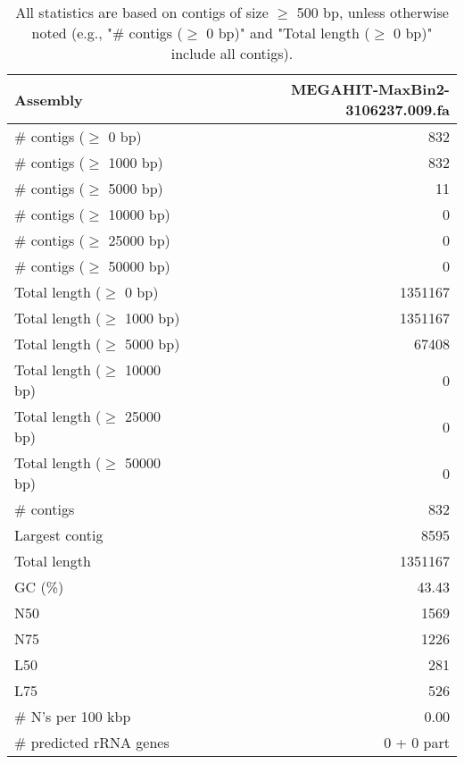 \documentclass[12pt,a4paper]{article}
\begin{document}
\begin{table}[ht]
\begin{center}
\caption{All statistics are based on contigs of size $\geq$ 500 bp, unless otherwise noted (e.g., "\# contigs ($\geq$ 0 bp)" and "Total length ($\geq$ 0 bp)" include all contigs).}
\begin{tabular}{|l*{1}{|r}|}
\hline
Assembly & MEGAHIT-MaxBin2-3106237.009.fa \\ \hline
\# contigs ($\geq$ 0 bp) & 832 \\ \hline
\# contigs ($\geq$ 1000 bp) & 832 \\ \hline
\# contigs ($\geq$ 5000 bp) & 11 \\ \hline
\# contigs ($\geq$ 10000 bp) & 0 \\ \hline
\# contigs ($\geq$ 25000 bp) & 0 \\ \hline
\# contigs ($\geq$ 50000 bp) & 0 \\ \hline
Total length ($\geq$ 0 bp) & 1351167 \\ \hline
Total length ($\geq$ 1000 bp) & 1351167 \\ \hline
Total length ($\geq$ 5000 bp) & 67408 \\ \hline
Total length ($\geq$ 10000 bp) & 0 \\ \hline
Total length ($\geq$ 25000 bp) & 0 \\ \hline
Total length ($\geq$ 50000 bp) & 0 \\ \hline
\# contigs & 832 \\ \hline
Largest contig & 8595 \\ \hline
Total length & 1351167 \\ \hline
GC (\%) & 43.43 \\ \hline
N50 & 1569 \\ \hline
N75 & 1226 \\ \hline
L50 & 281 \\ \hline
L75 & 526 \\ \hline
\# N's per 100 kbp & 0.00 \\ \hline
\# predicted rRNA genes & 0 + 0 part \\ \hline
\end{tabular}
\end{center}
\end{table}
\end{document}
